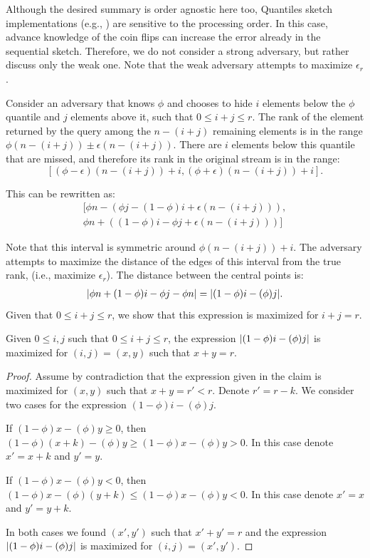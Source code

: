 Although the desired summary is order agnostic here too, Quantiles sketch implementations (e.g., \cite{agarwal2013mergeable})
are sensitive to the processing order. In this case, advance knowledge of the coin flips can increase the error
already in the sequential sketch. Therefore, we do not consider a strong adversary, but rather discuss only the weak one.
Note that the weak adversary attempts to maximize $\epsilon_r$.

Consider an adversary that knows $\phi$ and chooses to hide
$i$ elements below the $\phi$ quantile and $j$ elements above it, such that $0\leq i+j\leq r$. The rank of the element
returned by the query among the $n-(i+j)$ remaining elements is in the range 
$\phi(n-(i+j)) \pm \epsilon(n-(i+j))$.
There are $i$ elements below this quantile that are missed, and therefore its rank in the original stream is in the range:
\begin{equation}
    \left[ (\phi-\epsilon)(n-(i+j)) + i , (\phi+\epsilon)(n-(i+j)) + i \right].
    \label{fc-eq:rank-range}
\end{equation}

This can be rewritten as:
\begin{equation}
\begin{split}
    [\phi n - (\phi j - (1-\phi)i+\epsilon(n-(i+j))), \\
    \phi n + ((1-\phi)i - \phi j +\epsilon(n-(i+j))) ] 
\end{split}
    \label{fc-eq:rank-range-2}
\end{equation}

Note that this interval is symmetric around $\phi(n-(i+j)) + i$.
The adversary attempts to maximize the distance of the edges of this interval from the true rank,
(i.e., maximize $\epsilon_r$). The distance between the central points is:
\begin{align*}
    \lvert\phi n + (1-\phi)i - \phi j - \phi n\rvert=\lvert(1-\phi)i - (\phi)j\rvert.
\end{align*}
Given that $0\leq i+j\leq r$, we show that this expression is maximized
for $i+j=r$.
\begin{claim}
    Given $0\leq i,j$ such that $0\leq i+j\leq r$, the expression $\lvert(1-\phi)i - (\phi)j\rvert$
    is maximized for $(i,j)=(x,y)$ such that $x+y=r$.
    \label{fc-claim:sum-r}
\end{claim}
\begin{proof}
    Assume by contradiction that the expression given in the claim is maximized for $(x,y)$ such that $x+y=r'<r$. Denote
    $r'=r-k$. We consider two cases for the expression $(1-\phi)i - (\phi)j$.

    If $(1-\phi)x - (\phi)y \geq 0$, then $(1-\phi)(x+k) - (\phi)y \geq (1-\phi)x - (\phi)y >0$. In this
    case denote $x'=x+k$ and $y'=y$.

    If $(1-\phi)x - (\phi)y < 0$, then $(1-\phi)x - (\phi)(y+k) \leq (1-\phi)x - (\phi)y < 0$. In this
    case denote $x'=x$ and $y'=y+k$.

    In both cases we found $(x',y')$ such that $x'+y'=r$ and the expression $\lvert(1-\phi)i - (\phi)j\rvert$
    is maximized for $(i,j)=(x',y')$.
\end{proof}

